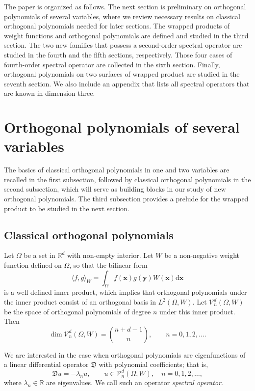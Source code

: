 \documentclass{amsart}
\theoremstyle{remark}
\def\la{{\langle}}
\def\ra{{\rangle}}
\def\d{\mathrm{d}}
\def\fD{{\mathfrak D}}
\def\l{{\lambda}}
\def\la{{\langle}}
\def\ra{{\rangle}}
\def\CV{{\mathcal V}}
\def\RR{{\mathbb R}}
\begin{document}
The paper is organized as follows. The next section is preliminary on orthogonal polynomials of several 
variables, where we review necessary results on classical orthogonal polynomials needed for later sections. 
The wrapped products of weight functions and orthogonal polynomials are defined and studied in the third 
section. The two new families that possess a second-order spectral operator are studied in the fourth and
the fifth sections, respectively. Those four cases of fourth-order spectral operator are collected in the
sixth section. Finally, orthogonal polynomials on two surfaces of wrapped product are studied in the 
seventh section. We also include an appendix that lists all spectral operators that are known in 
dimension three. 

\section{Orthogonal polynomials of several variables}
\setcounter{equation}{0}

The basics of classical orthogonal polynomials in one and two variables are recalled in the first subsection, 
followed by classical orthogonal polynomials in the second subsection, which will serve as building blocks
in our study of new orthogonal polynomials. The third subsection provides a prelude for the wrapped product
to be studied in the next section. 

\subsection{Classical orthogonal polynomials} 
Let $\Omega$ be a set in $\RR^d$ with non-empty interior. Let $W$ be a non-negative weight function defined 
on $\Omega$, %
so that the bilinear form 
$$
    \la f,g\ra_W = \int_{\Omega} f(\bm x) g(\bm y) W(\bm x) \d \bm x
$$
is a well-defined inner product, which implies that orthogonal polynomials under the inner product consist
of an orthogonal basis in $L^2(\Omega, W)$. Let $\CV_n^d(\Omega, W)$ be the space of orthogonal 
polynomials of degree $n$ under this inner product. Then 
\begin{equation}\label{eq:dimVn}
  \dim \CV_n^d(\Omega, W) = \binom{n+d-1}{n}, \qquad n = 0,1,2, \ldots. 
\end{equation}
 
We are interested in the case when orthogonal polynomials are eigenfunctions of a linear differential operator
$\fD$ with polynomial coefficients; that is, 
$$
  \fD u =  - \l_n u, \qquad u \in \CV_n^d(\Omega, W), \quad n=0, 1, 2, \ldots,
$$
where $\l_n \in \RR$ are eigenvalues. We call such an operator {\it spectral operator}. 
\end{document}
